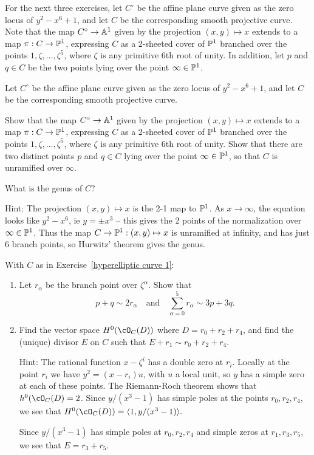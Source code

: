 For the next three exercises, let $C^\circ$ be the affine plane curve given as the zero locus of $y^2 - x^6 +1$, and let $C$ be the corresponding smooth projective curve. Note that the map $C^\circ \to \AA^1$ given by the projection $(x,y) \mapsto x$ extends to a map $\pi : C \to \PP^1$, expressing $C$ as a 2-sheeted cover of $\PP^1$ branched over the points $1, \zeta, \dots, \zeta^5$, where $\zeta$ is any primitive 6th root of unity. In addition, let $p$ and $q \in C$ be the two points lying over the point $\infty \in \PP^1$.

\begin{exercise}\label{hyperelliptic curve 1}
Let $C^\circ$ be the affine plane curve given as the zero locus of $y^2 - x^6 +1$, and let $C$ be the corresponding smooth projective curve. 

Show  that the map $C^\circ \to \AA^1$ given by the projection $(x,y) \mapsto x$ extends to a map $\pi : C \to \PP^1$, expressing $C$ as a 2-sheeted cover of $\PP^1$ branched over the points $1, \zeta, \dots, \zeta^5$, where $\zeta$ is any primitive 6th root of unity. Show that there are two distinct points $p$ and $q \in C$  lying over the point $\infty \in \PP^1$,
so that $C$ is unramified over $\infty$.

What is the genus of $C$?

Hint: The projection $(x,y) \mapsto x$ is the 2-1 map to $\PP^1$. As $x\to \infty$, the equation looks like $y^2-x^6$, ie $y= \pm x^3$ -- this gives the 2 points of the normalization over $\infty\in \PP^1$. Thus the map $C\to \PP^1: (x,y) \mapsto x$
is unramified at infinity, and has just 6 branch points, so Hurwitz' theorem gives the genus.

\end{exercise}

\begin{exercise} With $C$ as in Exercise~\ref{hyperelliptic curve 1}:
\begin{enumerate}

\item Let $r_\alpha$ be the branch point over $\zeta^\alpha$. Show that
$$
p+q \sim 2r_\alpha \quad \text{and} \quad \sum_{\alpha = 0}^5 r_\alpha \sim 3p+3q.
$$

\item Find the vector space $H^0(\cO_C(D))$ where $D = r_0 + r_2 + r_4$, and find the (unique) divisor $E$ on $C$ such that $E + r_1 \sim r_0 + r_2 + r_4$.

Hint: The rational function $x-\zeta^i$ has a double zero at $r_i$. Locally at the point $r_i$ we have $y^2 = (x-r_i)u$,
with $u$ a local unit, so $y$ has a simple zero at each of these points. The Riemann-Roch theorem shows that $h^0(\cO_C(D) = 2$. Since $y/(x^3-1)$ has simple poles at the points $r_0,r_2,r_4,$ we see that $H^0(\cO_C(D)) = \langle1, y/(x^3-1)\rangle.$ 

Since $y/(x^3-1)$ has simple poles at $r_0,r_2,r_4$ and simple zeros at $r_1,r_3,r_5$, we see that $E = r_3+r_5$.
\end{enumerate}

\end{exercise}

